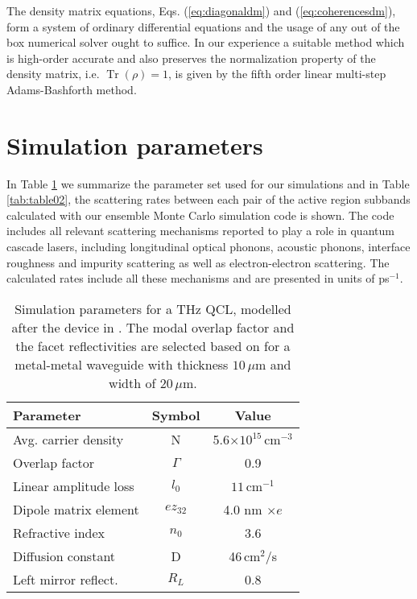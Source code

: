\documentclass[10pt]{article}
\DeclareMathOperator{\Tr}{Tr}
\begin{document}
\begin{appendices}
The density matrix equations, Eqs. (\ref{eq:diagonaldm}) and
(\ref{eq:coherencesdm}), form a system of ordinary differential equations
and the usage of any out of the box numerical solver ought to suffice. In our
experience a suitable method which is high-order accurate and also preserves
the normalization property of the density matrix, i.e. $\Tr(\rho)=1$, is given
by the fifth order linear multi-step Adams-Bashforth method.

\section{Simulation parameters}		
\label{sec:params}

In Table \ref{tab:table01} we summarize the parameter set
used for our simulations and in Table \ref{tab:table02}, the scattering rates
between each pair of the active region subbands calculated with our ensemble
Monte Carlo simulation code \cite{jirauschek2014modeling} is shown. The code
includes all relevant scattering mechanisms reported to play a role in quantum
cascade lasers, including longitudinal optical phonons, acoustic phonons,
interface roughness and impurity scattering as well as electron-electron
scattering. The calculated rates include all these mechanisms and are
presented in units of ps$^{-1}$.
\begin{table}[h!]
	{\footnotesize
		\caption[Table caption text]{Simulation parameters for a THz QCL, modelled
			after the device in \cite{burghoff2014terahertz}. The modal overlap factor and
			the facet reflectivities are selected based on \cite{kohen2005electromagnetic}
			for a metal-metal waveguide with thickness $10{\,}\mu\mathrm{m}$ and width of
			$20{\,}\mu\mathrm{m}$.}\label{tab:table01}
		\begin{tabular}
		{|p{26mm}cc|}\hline
			\textbf{Parameter} & \textbf{Symbol} & \textbf{Value}\\\hline
			Avg. carrier density & N & 5.6$\times10^{15}\,$cm$^{-3}$\\
			Overlap factor & $\Gamma$ & 0.9\\
			Linear amplitude loss  & $l_{0}$ & $11\,$cm$^{-1}$\\
			Dipole matrix element & $ez_{32}$ & 4.0 nm $\times e$\\
			Refractive index & $n_{0}$ & 3.6\\
			Diffusion constant & D & 46$\,$cm$^{2}$/s\\
			Left mirror reflect. & $R_{L}$ & 0.8 \\
			\hline

\end{tabular}}
\end{table}
\end{appendices}
\end{document}
